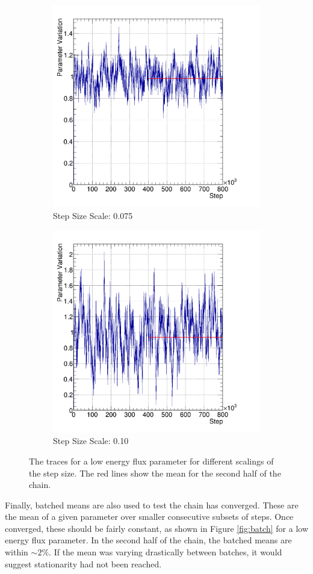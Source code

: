\begin{figure}
\begin{subfigure}{.5\textwidth}
  \includegraphics[width=0.73\linewidth]{figs/trace2}
  \caption{Step Size Scale: 0.075}
  \label{fig:trace2}
\end{subfigure}%
\begin{subfigure}{.5\textwidth}
  \centering
  \includegraphics[width=0.73\linewidth]{figs/trace3}
  \caption{Step Size Scale: 0.10}
  \label{fig:trace3}
\end{subfigure}
\caption{The traces for a low energy flux parameter for different scalings of the step size. The red lines show the mean for the second half of the chain.}
\label{fig:traces}
\end{figure}

Finally, batched means are also used to test the chain has converged. These are the mean of a given parameter over smaller consecutive subsets of steps. Once converged, these should be fairly constant, as shown in Figure \ref{fig:batch} for a low energy flux parameter. In the second half of the chain, the batched means are within $\sim 2\%$. If the mean was varying drastically between batches, it would suggest stationarity had not been reached.

